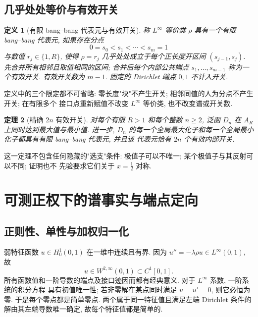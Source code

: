 \documentclass[UTF8]{ctexart}
\newtheorem{theorem}{定理}[section]
\newtheorem{definition}[theorem]{定义}
\begin{document}
\subsection{几乎处处等价与有效开关}

\begin{definition}[有限 bang--bang 代表元与有效开关]\label{def:switch}
称 $L^\infty$ 等价类 $\rho$ 具有一个有限 bang--bang 代表元, 如果存在分点
\begin{equation*}
	0=s_0<s_1<\cdots<s_m=1
\end{equation*}
与数值 $r_j\in\{1,R\}$, 使得 $\rho=r_j$ 几乎处处成立于每个正长度开区间 $(s_{j-1},s_j)$.
先合并所有相邻且取值相同的区间; 合并后每个内部公共端点 $s_1,\dots,s_{m-1}$ 称为一个有效开关.
有效开关数为 $m-1$. 固定的 Dirichlet 端点 $0,1$ 不计入开关.
\end{definition}

定义中的三个限定都不可省略: 零长度"块"不产生开关; 相邻同值的人为分点不产生开关; 在有限多个
接口点重新赋值不改变 $L^\infty$ 等价类, 也不改变谱或开关数.

\begin{theorem}[精确 $2n$ 有效开关]\label{thm:main}
对每个有限 $R>1$ 和每个整数 $n\ge2$, 泛函 $D_n$ 在 $A_R$ 上同时达到最大值与最小值.
进一步, $D_n$ 的每一个全局最大化子和每一个全局最小化子都具有有限 bang--bang 代表元, 并且该
代表元恰有 $2n$ 个有效内部开关.
\end{theorem}

这一定理不包含任何隐藏的"选支"条件: 极值子可以不唯一; 某个极值子与其反射可以不同; 证明也不
先验要求它们关于 $x=\tfrac12$ 对称.

\section{可测正权下的谱事实与端点定向}
\subsection{正则性、单性与加权归一化}

弱特征函数 $u\in H^1_0(0,1)$ 在一维中连续且有界. 因为 $u''=-\lambda\rho u\in L^\infty(0,1)$, 故
\begin{equation}
	u\in W^{2,\infty}(0,1)\subset C^1[0,1] .
	\label{eq:regularity}
\end{equation}
所有函数值和一阶导数的端点及接口迹因而都有经典意义. 对于 $L^\infty$ 系数, 一阶系统的积分方程
具有初值唯一性; 若非零解在某点同时满足 $u=u'=0$, 则它必恒为零. 于是每个零点都是简单零点.
两个属于同一特征值且满足左端 Dirichlet 条件的解由其左端导数唯一确定, 故每个特征值都是简单的.
\end{document}
